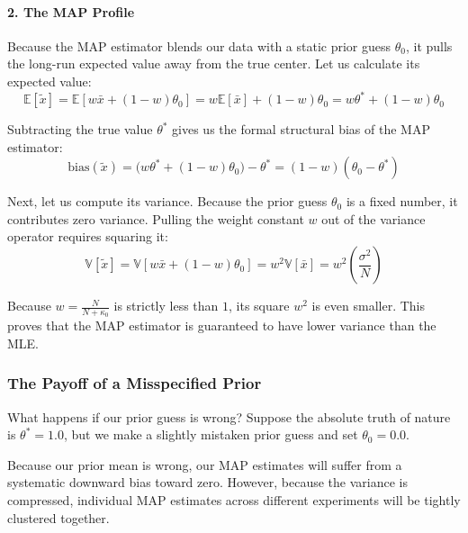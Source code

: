 \documentclass{article}
\begin{document}
\paragraph{2. The MAP Profile}
Because the MAP estimator blends our data with a static prior guess $\theta_0$, it pulls the long-run expected value away from the true center. Let us calculate its expected value:
\begin{equation}
\mathbb{E}[\tilde{x}] = \mathbb{E}[w\bar{x} + (1 - w)\theta_0] = w\mathbb{E}[\bar{x}] + (1 - w)\theta_0 = w\theta^* + (1 - w)\theta_0
\end{equation}

Subtracting the true value $\theta^*$ gives us the formal structural bias of the MAP estimator:
\begin{equation}
\text{bias}(\tilde{x}) = \big(w\theta^* + (1 - w)\theta_0\big) - \theta^* = (1 - w)(\theta_0 - \theta^*)
\end{equation}

Next, let us compute its variance. Because the prior guess $\theta_0$ is a fixed number, it contributes zero variance. Pulling the weight constant $w$ out of the variance operator requires squaring it:
\begin{equation}
\mathbb{V}[\tilde{x}] = \mathbb{V}[w\bar{x} + (1 - w)\theta_0] = w^2 \mathbb{V}[\bar{x}] = w^2 \left(\frac{\sigma^2}{N}\right)
\end{equation}

Because $w = \frac{N}{N+\kappa_0}$ is strictly less than $1$, its square $w^2$ is even smaller. This proves that the MAP estimator is guaranteed to have lower variance than the MLE.

\subsubsection{The Payoff of a Misspecified Prior}
What happens if our prior guess is wrong? Suppose the absolute truth of nature is $\theta^* = 1.0$, but we make a slightly mistaken prior guess and set $\theta_0 = 0.0$. 

Because our prior mean is wrong, our MAP estimates will suffer from a systematic downward bias toward zero. However, because the variance is compressed, individual MAP estimates across different experiments will be tightly clustered together. 
\end{document}
